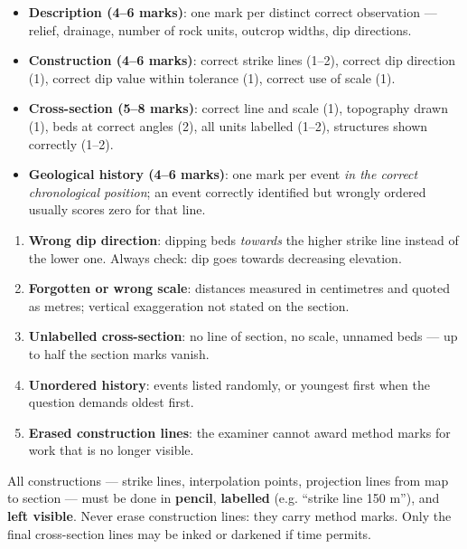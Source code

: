 \documentclass[11pt]{article}
\begin{document}
\begin{itemize}
\item \textbf{Description (4--6 marks)}: one mark per distinct correct observation --- relief, drainage, number of rock units, outcrop widths, dip directions.
\item \textbf{Construction (4--6 marks)}: correct strike lines (1--2), correct dip direction (1), correct dip value within tolerance (1), correct use of scale (1).
\item \textbf{Cross-section (5--8 marks)}: correct line and scale (1), topography drawn (1), beds at correct angles (2), all units labelled (1--2), structures shown correctly (1--2).
\item \textbf{Geological history (4--6 marks)}: one mark per event \emph{in the correct chronological position}; an event correctly identified but wrongly ordered usually scores zero for that line.
\end{itemize}

\begin{attention}
\begin{enumerate}
\item \textbf{Wrong dip direction}: dipping beds \emph{towards} the higher strike line instead of the lower one. Always check: dip goes towards decreasing elevation.
\item \textbf{Forgotten or wrong scale}: distances measured in centimetres and quoted as metres; vertical exaggeration not stated on the section.
\item \textbf{Unlabelled cross-section}: no line of section, no scale, unnamed beds --- up to half the section marks vanish.
\item \textbf{Unordered history}: events listed randomly, or youngest first when the question demands oldest first.
\item \textbf{Erased construction lines}: the examiner cannot award method marks for work that is no longer visible.
\end{enumerate}
\end{attention}

\begin{attention}
All constructions --- strike lines, interpolation points, projection lines from map to section --- must be done in \textbf{pencil}, \textbf{labelled} (e.g. ``strike line 150 m''), and \textbf{left visible}. Never erase construction lines: they carry method marks. Only the final cross-section lines may be inked or darkened if time permits.
\end{attention}
\end{document}
